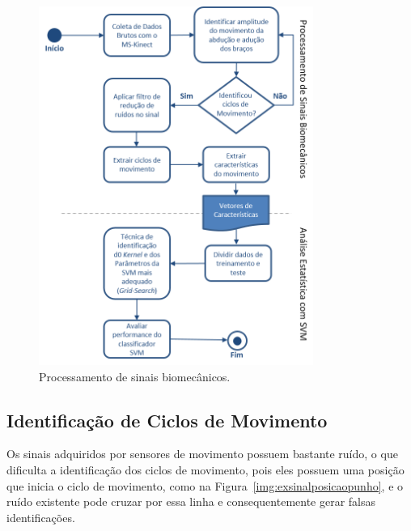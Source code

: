 \begin{figure}[!htb]
     \centering
     \includegraphics[width=0.8\textwidth]{./img/biomecprocessor2.png}
     \caption{Processamento de sinais biomecânicos.}
     \label{img:process_bio}
\end{figure}


\subsection{Identificação de Ciclos de Movimento}\label{section:identificao_ciclos}

Os sinais adquiridos por sensores de movimento possuem bastante ruído, o que dificulta a identificação dos ciclos de movimento, pois eles possuem uma posição que inicia o ciclo de movimento, como na Figura~\ref{img:exsinalposicaopunho}, e o ruído existente pode cruzar por essa linha e consequentemente gerar falsas identificações. 

